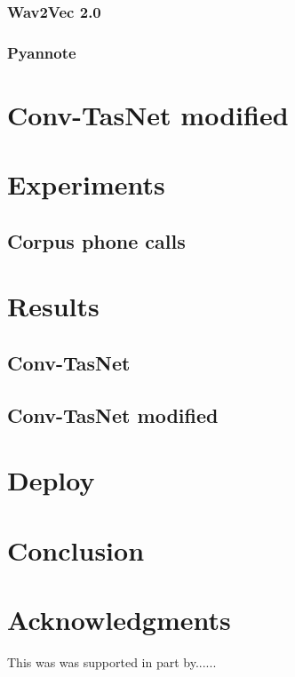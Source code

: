 \documentclass{article}
\begin{document}
\subsubsection{Wav2Vec 2.0}
\subsubsection{Pyannote}

\section{Conv-TasNet modified}

\section{Experiments}
\subsection{Corpus phone calls}

\section{Results}
\subsection{Conv-TasNet}
\subsection{Conv-TasNet modified}

\section{Deploy}

\section{Conclusion}


\section*{Acknowledgments}
This was was supported in part by......

  
  
\end{document}
